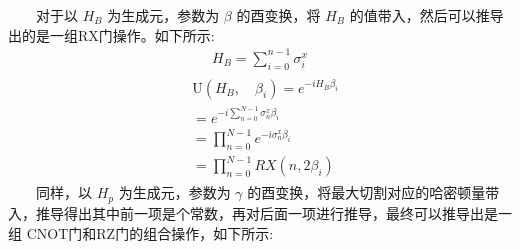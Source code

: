 \documentclass[a4paper,11pt,english]{sphinxmanual}
\begin{document}
\sphinxAtStartPar
  对于以  \(H_{B}\) 为生成元，参数为  \(\beta\) 的酉变换，将  \(H_{B}\) 的值带入，然后可以推导出的是一组RX门操作。如下所示:
\begin{equation*}
\begin{split}H_{B}=\sum_{i=0}^{n-1} \sigma_{i}^{x}\end{split}
\end{equation*}\begin{equation*}
\begin{split}\begin{aligned} &\mathrm{U}\left(H_{B}, \quad \beta_{i}\right)=e^{-i H_{B} \beta_{i}} \\ &=e^{-{i} \sum_{n=0}^{N-1} \sigma_{n}^{x} \beta_{i}} \\ &=\prod_{n=0}^{N-1} e^{-i \sigma_{n}^{x} \beta_{i}} \\ &=\prod_{n=0}^{N-1} R X\left(n, 2 \beta_{i}\right) \end{aligned}\end{split}
\end{equation*}
\sphinxAtStartPar
  同样，以  \(H_{p}\) 为生成元，参数为  \(\gamma\) 的酉变换，将最大切割对应的哈密顿量带入，推导得出其中前一项是个常数，再对后面一项进行推导，最终可以推导出是一组 CNOT门和RZ门的组合操作，如下所示:
\end{document}
